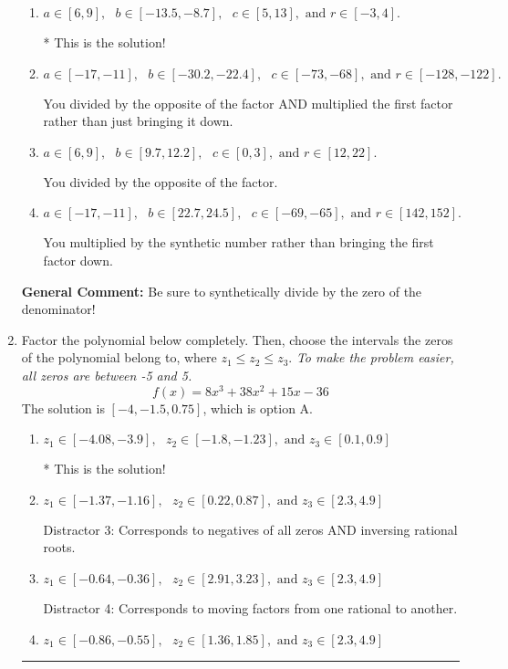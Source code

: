 \documentclass{extbook}[14pt]
\newcommand{\litem}[1]{\item #1

\rule{\textwidth}{0.4pt}}
\begin{document}
\begin{enumerate}
{\begin{enumerate}[label=\Alph*.]
 You multiplied by the synthetic number and subtracted rather than adding during synthetic division.
\item \( a \in [6, 9], \text{   } b \in [-13.5, -8.7], \text{   } c \in [5, 13], \text{   and   } r \in [-3, 4]. \)

* This is the solution!
\item \( a \in [-17, -11], \text{   } b \in [-30.2, -22.4], \text{   } c \in [-73, -68], \text{   and   } r \in [-128, -122]. \)

 You divided by the opposite of the factor AND multiplied the first factor rather than just bringing it down.
\item \( a \in [6, 9], \text{   } b \in [9.7, 12.2], \text{   } c \in [0, 3], \text{   and   } r \in [12, 22]. \)

 You divided by the opposite of the factor.
\item \( a \in [-17, -11], \text{   } b \in [22.7, 24.5], \text{   } c \in [-69, -65], \text{   and   } r \in [142, 152]. \)

 You multiplied by the synthetic number rather than bringing the first factor down.
\end{enumerate}

\textbf{General Comment:} Be sure to synthetically divide by the zero of the denominator!
}
\litem{
Factor the polynomial below completely. Then, choose the intervals the zeros of the polynomial belong to, where $z_1 \leq z_2 \leq z_3$. \textit{To make the problem easier, all zeros are between -5 and 5.}
\[ f(x) = 8x^{3} +38 x^{2} +15 x -36 \]The solution is \( [-4, -1.5, 0.75] \), which is option A.\begin{enumerate}[label=\Alph*.]
\item \( z_1 \in [-4.08, -3.9], \text{   }  z_2 \in [-1.8, -1.23], \text{   and   } z_3 \in [0.1, 0.9] \)

* This is the solution!
\item \( z_1 \in [-1.37, -1.16], \text{   }  z_2 \in [0.22, 0.87], \text{   and   } z_3 \in [2.3, 4.9] \)

 Distractor 3: Corresponds to negatives of all zeros AND inversing rational roots.
\item \( z_1 \in [-0.64, -0.36], \text{   }  z_2 \in [2.91, 3.23], \text{   and   } z_3 \in [2.3, 4.9] \)

 Distractor 4: Corresponds to moving factors from one rational to another.
\item \( z_1 \in [-0.86, -0.55], \text{   }  z_2 \in [1.36, 1.85], \text{   and   } z_3 \in [2.3, 4.9] \)


\end{enumerate}}
\end{enumerate}
\end{document}
